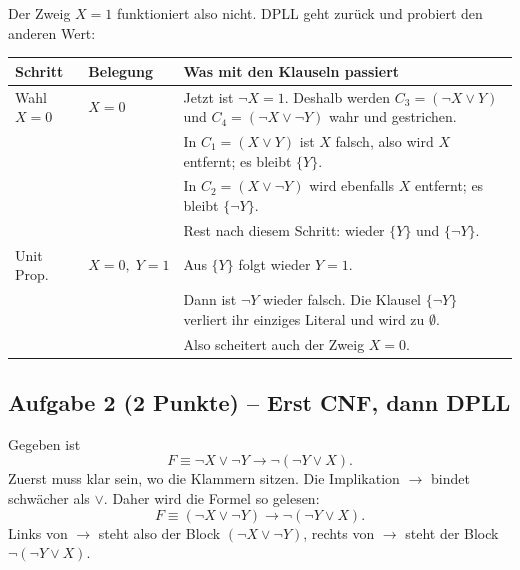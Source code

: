 \documentclass[a4paper,12pt]{article}
\begin{document}
Der Zweig $X=1$ funktioniert also nicht. DPLL geht zur\"uck und probiert
den anderen Wert:

\begin{center}
\small
\renewcommand{\arraystretch}{1.25}
\begin{tabular}{p{}p{}p{}}
\toprule
Schritt & Belegung & Was mit den Klauseln passiert \\
\midrule
Wahl $X=0$
& $X=0$
& Jetzt ist $\neg X=1$. Deshalb werden $C_3=(\neg X\vee Y)$ und
  $C_4=(\neg X\vee\neg Y)$ wahr und gestrichen.\\
&& In $C_1=(X\vee Y)$ ist $X$ falsch, also wird $X$ entfernt;
  es bleibt $\{Y\}$.\\
&& In $C_2=(X\vee\neg Y)$ wird ebenfalls $X$ entfernt;
  es bleibt $\{\neg Y\}$.\\
&& Rest nach diesem Schritt: wieder $\{Y\}$ und $\{\neg Y\}$. \\
\midrule
Unit Prop.
& $X=0,\;Y=1$
& Aus $\{Y\}$ folgt wieder $Y=1$.\\
&& Dann ist $\neg Y$ wieder falsch. Die Klausel $\{\neg Y\}$ verliert
  ihr einziges Literal und wird zu $\emptyset$.\\
&& Also scheitert auch der Zweig $X=0$. \\
\bottomrule
\end{tabular}
\end{center}

\medskip
\noindent{}

\newpage

\subsection*{Aufgabe 2 \textnormal{(2 Punkte)} -- Erst CNF, dann DPLL}

Gegeben ist
\[
F \equiv \neg X \vee \neg Y \to \neg(\neg Y \vee X).
\]
Zuerst muss klar sein, wo die Klammern sitzen. Die Implikation $\to$
bindet schw\"acher als $\vee$. Daher wird die Formel so gelesen:
\[
F \equiv (\neg X \vee \neg Y) \to \neg(\neg Y \vee X).
\]
Links von $\to$ steht also der Block $(\neg X \vee \neg Y)$,
rechts von $\to$ steht der Block $\neg(\neg Y \vee X)$.
\end{document}
